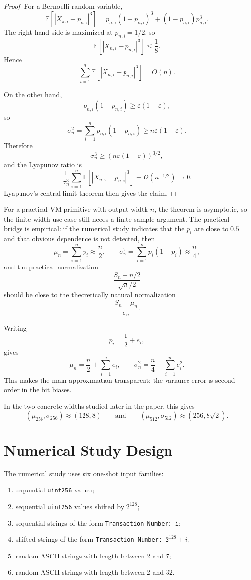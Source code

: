 \documentclass[11pt]{article}
\begin{document}
\begin{proof}
For a Bernoulli random variable,
\[
\mathbb{E}\left[\left|X_{n,i} - p_{n,i}\right|^3\right]
= p_{n,i}(1-p_{n,i})^3 + (1-p_{n,i})p_{n,i}^3.
\]
The right-hand side is maximized at $p_{n,i}=1/2$, so
\[
\mathbb{E}\left[\left|X_{n,i} - p_{n,i}\right|^3\right] \le \frac{1}{8}.
\]
Hence
\[
\sum_{i=1}^n \mathbb{E}\left[\left|X_{n,i} - p_{n,i}\right|^3\right] = O(n).
\]

On the other hand,
\[
p_{n,i}(1-p_{n,i}) \ge \varepsilon(1-\varepsilon),
\]
so
\[
\sigma_n^2 = \sum_{i=1}^n p_{n,i}(1-p_{n,i}) \ge n\varepsilon(1-\varepsilon).
\]
Therefore
\[
\sigma_n^3 \ge \left(n\varepsilon(1-\varepsilon)\right)^{3/2},
\]
and the Lyapunov ratio is
\[
\frac{1}{\sigma_n^3}
\sum_{i=1}^n \mathbb{E}\left[\left|X_{n,i} - p_{n,i}\right|^3\right]
= O(n^{-1/2}) \to 0.
\]
Lyapunov's central limit theorem then gives the claim.
\end{proof}

For a practical VM primitive with output width $n$, the theorem is asymptotic,
so the finite-width use case still needs a finite-sample argument. The
practical bridge is empirical: if the numerical study indicates that the $p_i$
are close to $0.5$ and that obvious dependence is not detected, then
\[
\mu_n = \sum_{i=1}^{n} p_i \approx \frac{n}{2},
\qquad
\sigma_n^2 = \sum_{i=1}^{n} p_i(1-p_i) \approx \frac{n}{4},
\]
and the practical normalization
\[
\frac{S_n-n/2}{\sqrt{n}/2}
\]
should be close to the theoretically natural normalization
\[
\frac{S_n-\mu_n}{\sigma_n}.
\]

Writing
\[
p_i = \frac{1}{2} + e_i,
\]
gives
\[
\mu_n = \frac{n}{2} + \sum_{i=1}^{n} e_i,
\qquad
\sigma_n^2 = \frac{n}{4} - \sum_{i=1}^{n} e_i^2.
\]
This makes the main approximation transparent: the variance error is
second-order in the bit biases.

In the two concrete widths studied later in the paper, this gives
\[
(\mu_{256}, \sigma_{256}) \approx (128, 8)
\qquad \text{and} \qquad
(\mu_{512}, \sigma_{512}) \approx (256, 8\sqrt{2}).
\]

\section{Numerical Study Design}

The numerical study uses six one-shot input families:
\begin{enumerate}
\item sequential \texttt{uint256} values;
\item sequential \texttt{uint256} values shifted by $2^{128}$;
\item sequential strings of the form \texttt{Transaction Number: i};
\item shifted strings of the form \texttt{Transaction Number: }$2^{128}+i$;
\item random ASCII strings with length between $2$ and $7$;
\item random ASCII strings with length between $2$ and $32$.
\end{enumerate}
\end{document}
